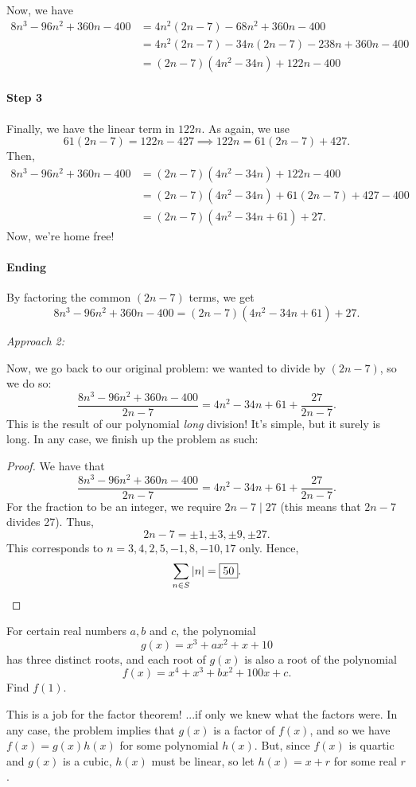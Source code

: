 \documentclass[../jarvis.tex]{subfiles}
\begin{document}
Now, we have
\begin{align*}
    8n^3-96n^2+360n-400&=4n^2(2n-7)-68n^2+360n-400 \\
    &=4n^2(2n-7)-34n(2n-7)-238n+360n-400\\
    &=(2n-7)(4n^2-34n)+122n-400
\end{align*}

\paragraph{Step 3}Finally, we have the linear term in $122n$.
As again, we use $$61(2n-7)=122n-427 \implies 122n=61(2n-7)+427.$$ Then, 
\begin{align*}
    8n^3-96n^2+360n-400 &= (2n-7)(4n^2-34n)+122n-400 \\
    &= (2n-7)(4n^2-34n)+61(2n-7)+427-400 \\
    &= (2n-7)(4n^2-34n+61)+27.
\end{align*}
Now, we're home free!
\paragraph{Ending}
By factoring the common $(2n-7)$ terms, we get
$$8n^3-96n^2+360n-400=(2n-7)(4n^2-34n+61)+27.$$ 

\textit{Approach 2:}
\begin{center}
\end{center}
    
Now, we go back to our original problem: we wanted to divide by $(2n-7)$, so we do so:
$$\frac{8n^3-96n^2+360n-400}{2n-7}=4n^2-34n+61+\frac{27}{2n-7}.$$
This is the result of our polynomial \textit{long} division! It's simple, but it surely is long. In any case, we finish up the problem as such:

\begin{proof}
    We have that $$\frac{8n^3-96n^2+360n-400}{2n-7}=4n^2-34n+61+\frac{27}{2n-7}.$$
    For the fraction to be an integer, we require $2n-7\mid 27$ (this means that $2n-7$ divides 27). Thus,
    $$2n-7=\pm 1,\pm 3, \pm 9,\pm 27.$$
    This corresponds to $n=3,4,2,5,-1,8,-10,17$ only. Hence,
    $$\sum_{n\in S}\left\lvert n \right\rvert=\boxed{50}.$$
\end{proof}

\begin{example}[2017 AMC12A P23]
    For certain real numbers $a,b$ and $c$, the polynomial
    $$g(x)=x^3+ax^2+x+10$$ has three distinct roots, and each root of $g(x)$ is also a root of the polynomial
    $$f(x)=x^4+x^3+bx^2+100x+c.$$
    Find $f(1)$.
\end{example}
This is a job for the factor theorem! ...if only we knew what the factors were. In any case, the problem implies that $g(x)$ is a factor of $f(x)$, and so we have
$f(x)=g(x)h(x)$ for some polynomial $h(x)$. But, since $f(x)$ is quartic and $g(x)$ is a cubic, $h(x)$ must be linear, so let $h(x)=x+r$ for some real $r$.
\end{document}
